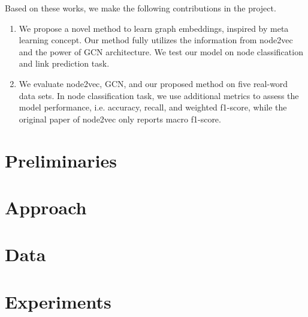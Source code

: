 \documentclass[sigconf]{acmart}
\begin{document}
Based on these works, we make the following contributions in the project.
\begin{enumerate}
    \item We propose a novel method to learn graph embeddings, inspired by meta learning concept. Our method fully utilizes the information from node2vec and the power of GCN architecture. We test our model on node classification and link prediction task.
    \item We evaluate node2vec, GCN, and our proposed method on five real-word data sets. In node classification task, we use additional metrics to assess the model performance, i.e. accuracy, recall, and weighted f1-score, while the original paper of node2vec only reports macro f1-score.
\end{enumerate}



\section{Preliminaries}


\section{Approach}


\section{Data}


\section{Experiments}

\end{document}

